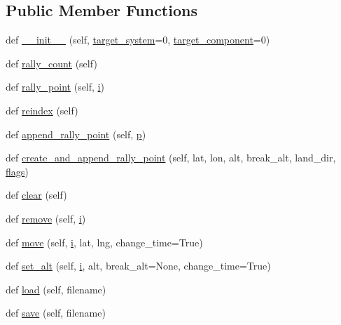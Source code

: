 \subsection*{Public Member Functions}
\begin{DoxyCompactItemize}
\item 
def \mbox{\hyperlink{classpymavlink_1_1mavwp_1_1MAVRallyLoader_a566bf2ce40fb10c41cbe6265ca84671b}{\+\_\+\+\_\+init\+\_\+\+\_\+}} (self, \mbox{\hyperlink{classpymavlink_1_1mavwp_1_1MAVRallyLoader_a48808a91e7229e6cf1825dadf630b59f}{target\+\_\+system}}=0, \mbox{\hyperlink{classpymavlink_1_1mavwp_1_1MAVRallyLoader_af0fd1de971ba030f24d897219f4094cb}{target\+\_\+component}}=0)
\item 
def \mbox{\hyperlink{classpymavlink_1_1mavwp_1_1MAVRallyLoader_ac740bccce1976db42e9dbbced54fb8ed}{rally\+\_\+count}} (self)
\item 
def \mbox{\hyperlink{classpymavlink_1_1mavwp_1_1MAVRallyLoader_a734094aad4618eef743ee42b33495537}{rally\+\_\+point}} (self, \mbox{\hyperlink{velTest_8cpp_a1239420b8759f52cbab64225b82461e2}{i}})
\item 
def \mbox{\hyperlink{classpymavlink_1_1mavwp_1_1MAVRallyLoader_a727649ff011c06cb84d8dd9bce24f30e}{reindex}} (self)
\item 
def \mbox{\hyperlink{classpymavlink_1_1mavwp_1_1MAVRallyLoader_a1ba9e108ed71efde9f721482f713f971}{append\+\_\+rally\+\_\+point}} (self, \mbox{\hyperlink{velTest_8cpp_a739e18b8b6d072d434ebcb6ca486abb0}{p}})
\item 
def \mbox{\hyperlink{classpymavlink_1_1mavwp_1_1MAVRallyLoader_a34fca935daac50b5e47783e823091c37}{create\+\_\+and\+\_\+append\+\_\+rally\+\_\+point}} (self, lat, lon, alt, break\+\_\+alt, land\+\_\+dir, \mbox{\hyperlink{_8ycm__extra__conf_8py_abd73d8e4551f1a637280b3876d1ae2e3}{flags}})
\item 
def \mbox{\hyperlink{classpymavlink_1_1mavwp_1_1MAVRallyLoader_a7dced4f8b93c4dd55993fb889c65cf25}{clear}} (self)
\item 
def \mbox{\hyperlink{classpymavlink_1_1mavwp_1_1MAVRallyLoader_a91cb8625b32871e2dea3d54bc755db5a}{remove}} (self, \mbox{\hyperlink{velTest_8cpp_a1239420b8759f52cbab64225b82461e2}{i}})
\item 
def \mbox{\hyperlink{classpymavlink_1_1mavwp_1_1MAVRallyLoader_a42e1d8a77c00ac327e9438a5439f5778}{move}} (self, \mbox{\hyperlink{velTest_8cpp_a1239420b8759f52cbab64225b82461e2}{i}}, lat, lng, change\+\_\+time=True)
\item 
def \mbox{\hyperlink{classpymavlink_1_1mavwp_1_1MAVRallyLoader_a042fd3f1689362390b346e41ac8323dc}{set\+\_\+alt}} (self, \mbox{\hyperlink{velTest_8cpp_a1239420b8759f52cbab64225b82461e2}{i}}, alt, break\+\_\+alt=None, change\+\_\+time=True)
\item 
def \mbox{\hyperlink{classpymavlink_1_1mavwp_1_1MAVRallyLoader_aa6e38565a5644b7e5d1cc7dddd3b04cd}{load}} (self, filename)
\item 
def \mbox{\hyperlink{classpymavlink_1_1mavwp_1_1MAVRallyLoader_a58865ecbab82b1c707e53d1427cf53b4}{save}} (self, filename)
\end{DoxyCompactItemize}
